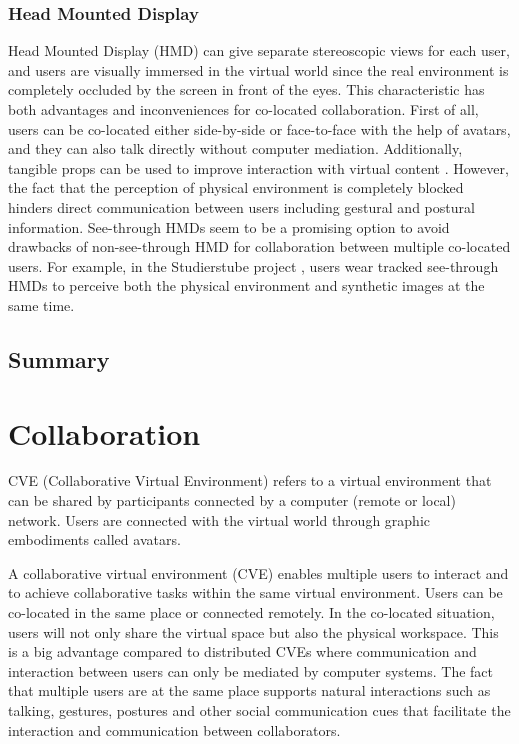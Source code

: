 \subsubsection{Head Mounted Display}
Head Mounted Display (HMD) can give separate stereoscopic views for each user, and users are visually immersed in the virtual world since the real environment is completely occluded by the screen in front of the eyes. This characteristic has both advantages and inconveniences for co-located collaboration. First of all, users can be co-located either side-by-side or face-to-face with the help of avatars, and they can also talk directly without computer mediation. Additionally, tangible props can be used to improve interaction with virtual content \citep{Salzmann2008TUS}. However, the fact that the perception of physical environment is completely blocked hinders direct communication between users including gestural and postural information. See-through HMDs seem to be a promising option to avoid drawbacks of non-see-through HMD for collaboration between multiple co-located users. For example, in the Studierstube project \citep{Schmalstieg2002Studierstube}, users wear tracked see-through HMDs to perceive both the physical environment and synthetic images at the same time.

\subsection{Summary}

\section{Collaboration}
CVE (Collaborative Virtual Environment) refers to a virtual environment that can be shared by participants connected by a computer (remote or local) network. Users are connected with the virtual world through graphic embodiments called avatars.

A collaborative virtual environment (CVE) \citep{Benford2001CVE} enables multiple users to interact \citep{Schroeder2006Usability} and to achieve collaborative tasks \citep{Dodds2009Using} within the same virtual environment. Users can be co-located in the same place or connected remotely. In the co-located situation, users will not only share the virtual space but also the physical workspace. This is a big advantage compared to distributed CVEs where communication and interaction between users can only be mediated by computer systems. The fact that multiple users are at the same place supports natural interactions such as talking, gestures, postures and other social communication cues that facilitate the interaction and communication between collaborators.

